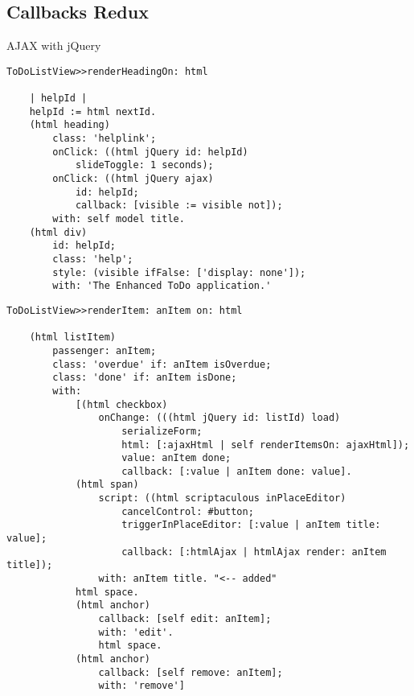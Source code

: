 \documentclass[a4paper,10pt,twoside]{book}
\newenvironment{todo}%
	{\obeylines\comment}%
	{\endtrivlist\normalsize}
\begin{document}
\subsection{Callbacks Redux}
\label{book:web20:jquery:enhancedtodoapplication:callbacksredux}

\begin{todo}
AJAX with jQuery

\end{todo}

\begin{lstlisting}
ToDoListView>>renderHeadingOn: html

    | helpId |
    helpId := html nextId.
    (html heading)
        class: 'helplink';
        onClick: ((html jQuery id: helpId)
            slideToggle: 1 seconds);
        onClick: ((html jQuery ajax)
            id: helpId;
            callback: [visible := visible not]);
        with: self model title.
    (html div)
        id: helpId;
        class: 'help';
        style: (visible ifFalse: ['display: none']);
        with: 'The Enhanced ToDo application.'
\end{lstlisting}

\begin{lstlisting}
ToDoListView>>renderItem: anItem on: html

    (html listItem)
        passenger: anItem;
        class: 'overdue' if: anItem isOverdue;
        class: 'done' if: anItem isDone;
        with: 
            [(html checkbox)
                onChange: (((html jQuery id: listId) load)
                    serializeForm;
                    html: [:ajaxHtml | self renderItemsOn: ajaxHtml]);
                    value: anItem done;
                    callback: [:value | anItem done: value].
            (html span)
                script: ((html scriptaculous inPlaceEditor)
                    cancelControl: #button;
                    triggerInPlaceEditor: [:value | anItem title: value];
                    callback: [:htmlAjax | htmlAjax render: anItem title]);
                with: anItem title.	"<-- added"
            html space.
            (html anchor)
                callback: [self edit: anItem];
                with: 'edit'.
                html space.
            (html anchor)
                callback: [self remove: anItem];
                with: 'remove']
\end{lstlisting}

\end{document}

